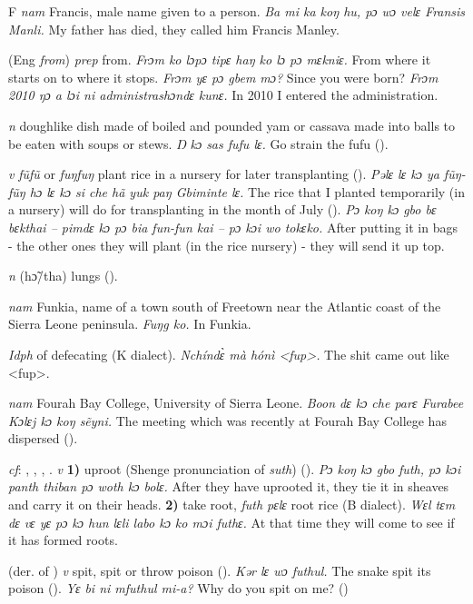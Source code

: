 \begin{letter}{F}
 \textit{nam} Francis, male name given to a person. \textit{Ba mi ka koŋ hu, pɔ wɔ velɛ Fransis Manli.} My father has died, they called him Francis Manley.

 (Eng \textit{from}) \textit{prep} from. \textit{Frɔm ko lɔpɔ tipɛ haŋ ko lɔ pɔ mɛkniɛ.} From where it starts on to where it stops. \textit{Frɔm yɛ pɔ gbem mɔ?} Since you were born? \textit{Frɔm 2010 ŋɔ a lɔi ni administrashɔndɛ kunɛ.} In 2010 I entered the administration.

 \textit{n} doughlike dish made of boiled and pounded yam or cassava made into balls to be eaten with soups or stews. \textit{Ŋ kɔ sas fufu lɛ.} Go strain the fufu (\citealt{Pichl1967}). 

 \textit{v} \textit{fũfũ} or \textit{fuŋfuŋ} plant rice in a nursery for later transplanting (\citealt{Pichl1967}). \textit{Pəlɛ lɛ kɔ ya fũŋ-fũŋ hɔ lɛ kɔ si che hã yuk paŋ Gbiminte lɛ.} The rice that I planted temporarily (in a nursery) will do for transplanting in the month of July (\citealt{Pichl1967}). \textit{Pɔ koŋ kɔ gbo bɛ bɛkthai – pimdɛ kɔ pɔ bia fun-fun kai – pɔ kɔi wo tokɛko.} After putting it in bags - the other ones they will plant (in the rice nursery) - they will send it up top. 

 \textit{n} (hɔ̃/tha) lungs (\citealt{Pichl1967}). 

 \textit{nam} Funkia, name of a town south of Freetown near the Atlantic coast of the Sierra Leone peninsula. \textit{Fuŋg ko.} In Funkia.

 \textit{Idph} of defecating (K dialect). \textit{Nchíndɛ̀ mà hónì <fup>.} The shit came out like <fup>.

 \textit{nam} Fourah Bay College, University of Sierra Leone. \textit{Boon dɛ kɔ che parɛ Furabee Kɔlɛj kɔ koŋ sẽyni.} The meeting which was recently at Fourah Bay College has dispersed (\citealt{Pichl1967}). 

 \textit{cf}: , , , . \textit{v} \textbf{1)} uproot (Shenge pronunciation of \textit{suth}) (\citealt{Pichl1967}). \textit{Pɔ koŋ kɔ gbo futh, pɔ kɔi panth thiban pɔ woth kɔ bolɛ.} After they have uprooted it, they tie it in sheaves and carry it on their heads. \textbf{2)} take root, \textit{futh pɛlɛ} root rice (B dialect). \textit{Wɛl tɛm dɛ vɛ yɛ pɔ kɔ hun lɛli labo kɔ ko mɔi futhɛ.} At that time they will come to see if it has formed roots.

 (der. of ) \textit{v} spit, spit or throw poison (\citealt{Pichl1967}). \textit{Kər lɛ wɔ futhul.} The snake spit its poison (\citealt{Pichl1967}). \textit{Yɛ bi ni mfuthul mi-a?} Why do you spit on me? (\citealt{Pichl1967}) 

\end{letter}

